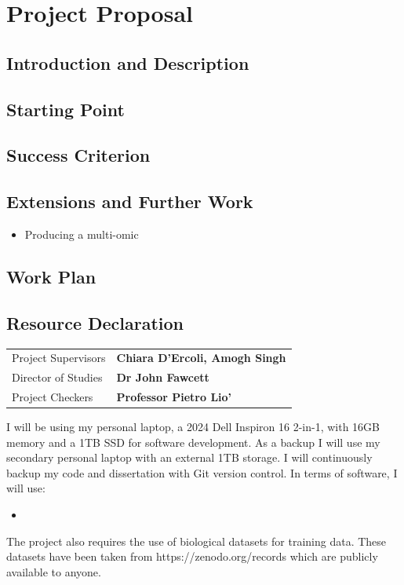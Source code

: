 \documentclass[12pt,a4paper]{report}
\begin{document}
\chapter{Project Proposal}
\section{Introduction and Description}
\section{Starting Point}
\section{Success Criterion}
\section{Extensions and Further Work}
\begin{itemize}
    \item Producing a multi-omic 
\end{itemize}
\section{Work Plan}
\section{Resource Declaration}
\begin{tabular}{@{}l@{ : }l}
Project Supervisors & \bf Chiara D'Ercoli, Amogh Singh \\
Director of Studies & \bf Dr John Fawcett \\ 
Project Checkers & \bf Professor Pietro Lio' \\
\end{tabular}

\vspace{2em}
I will be using my personal laptop, a 2024 Dell Inspiron 16 2-in-1, with 16GB memory and a 1TB SSD for software development. As a backup  I will use my secondary personal laptop with an external 1TB storage. I will continuously backup my code and dissertation with Git version control. In terms of software, I will use:
\begin{itemize}
    \item 
\end{itemize}
The project also requires the use of biological datasets for training data. These datasets have been taken from https://zenodo.org/records which are publicly available to anyone.
\end{document}
